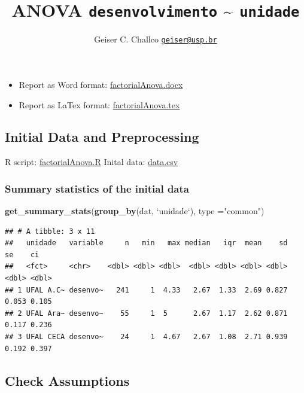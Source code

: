 \documentclass[]{article}
\title{ANOVA \texttt{desenvolvimento} \textasciitilde{} \texttt{unidade}}
\author{Geiser C. Challco \href{mailto:geiser@usp.br}{\nolinkurl{geiser@usp.br}}}
\date{}
\newenvironment{Shaded}{\begin{snugshade}}{\end{snugshade}}
\newcommand{\DataTypeTok}[1]{\textcolor[rgb]{0.13,0.29,0.53}{#1}}
\newcommand{\KeywordTok}[1]{\textcolor[rgb]{0.13,0.29,0.53}{\textbf{#1}}}
\newcommand{\NormalTok}[1]{#1}
\newcommand{\StringTok}[1]{\textcolor[rgb]{0.31,0.60,0.02}{#1}}
\providecommand{\tightlist}{%
  \setlength{\itemsep}{0pt}\setlength{\parskip}{0pt}}
\begin{document}
\maketitle

\begin{itemize}
\tightlist
\item
  Report as Word format: \url{factorialAnova.docx}
\item
  Report as LaTex format: \url{factorialAnova.tex}
\end{itemize}

\hypertarget{initial-data-and-preprocessing}{%
\subsection{Initial Data and
Preprocessing}\label{initial-data-and-preprocessing}}

R script: \url{factorialAnova.R} Inital data: \url{data.csv}

\hypertarget{summary-statistics-of-the-initial-data}{%
\subsubsection{Summary statistics of the initial
data}\label{summary-statistics-of-the-initial-data}}

\begin{Shaded}
\begin{Highlighting}[]
\KeywordTok{get_summary_stats}\NormalTok{(}\KeywordTok{group_by}\NormalTok{(dat, }\StringTok{`}\DataTypeTok{unidade}\StringTok{`}\NormalTok{), }\DataTypeTok{type =}\StringTok{"common"}\NormalTok{)}
\end{Highlighting}
\end{Shaded}

\begin{verbatim}
## # A tibble: 3 x 11
##   unidade   variable     n   min   max median   iqr  mean    sd    se    ci
##   <fct>     <chr>    <dbl> <dbl> <dbl>  <dbl> <dbl> <dbl> <dbl> <dbl> <dbl>
## 1 UFAL A.C~ desenvo~   241     1  4.33   2.67  1.33  2.69 0.827 0.053 0.105
## 2 UFAL Ara~ desenvo~    55     1  5      2.67  1.17  2.62 0.871 0.117 0.236
## 3 UFAL CECA desenvo~    24     1  4.67   2.67  1.08  2.71 0.939 0.192 0.397
\end{verbatim}

\hypertarget{check-assumptions}{%
\subsection{Check Assumptions}\label{check-assumptions}}
\end{document}
